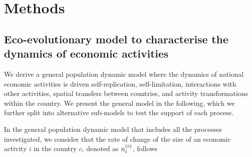 
\section{Methods}\label{sec:methods}
\subsection{Eco-evolutionary model to characterise the dynamics of economic activities}

We derive a general population dynamic model where the dynamics of national economic activities is driven self-replication, self-limitation, interactions with other activities, spatial transfers between countries, and activity transformations within the country. We present the general model in the following, which we further split into alternative sub-models to test the support of each process.

In the general population dynamic model that includes all the processes investigated, we consider that the rate of change of the size of an economic activity $i$ in the country $c$, denoted as $n_i^{(c)} $, follows

